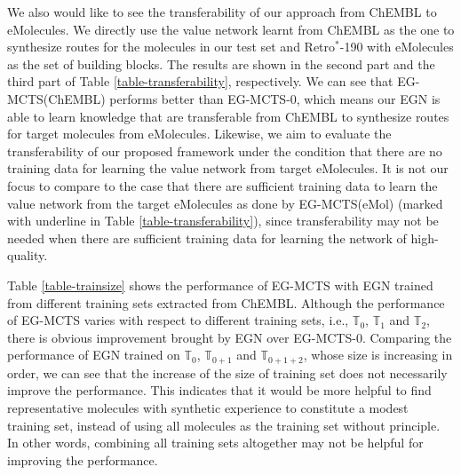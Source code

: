 \documentclass[sn-mathphys,Numbered]{sn-jnl}
\begin{document}
We also would like to see the transferability of our approach from ChEMBL to eMolecules. We directly use the value network learnt from ChEMBL as the one to synthesize routes for the molecules in our test set and Retro$^*$-190 with eMolecules as the set of building blocks. The results are shown in the second part and the third part of Table \ref{table-transferability}, respectively.
We can see that EG-MCTS(ChEMBL) performs better than EG-MCTS-0, which means our EGN is able to learn knowledge that are transferable from ChEMBL to synthesize routes for target molecules from eMolecules. 
Likewise, we aim to evaluate the transferability of our proposed framework under the condition that there are no training data for learning the value network from target eMolecules. It is not our focus to compare to the case that there are sufficient training data to learn the value network from the target eMolecules as done by EG-MCTS(eMol) (marked with underline in Table \ref{table-transferability}), since transferability may not be needed when there are sufficient training data for learning the network of high-quality. 


Table \ref{table-trainsize} shows the performance of EG-MCTS with EGN trained from different training sets extracted from ChEMBL.
Although the performance of EG-MCTS varies with respect to different training sets, i.e., $\mathbb{T}_0$, $\mathbb{T}_1$ and $\mathbb{T}_2$, there is obvious improvement brought by EGN over EG-MCTS-0.
Comparing the performance of EGN trained on $\mathbb{T}_0$, $\mathbb{T}_{0+1}$ and $\mathbb{T}_{0+1+2}$, whose size is increasing in order, we can see that the increase of the size of training set does not necessarily improve the performance.
This indicates that it would be more helpful to find representative molecules with synthetic experience to constitute a modest training set, instead of using all molecules as the training set without principle. In other words, combining all training sets altogether may not be helpful for improving the performance.
\end{document}

